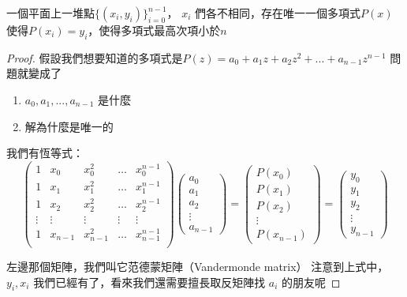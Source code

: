 \begin{lemma}
一個平面上一堆點$\{(x_i,y_i)\}^{n-1}_{i=0}$， $x_i$ 們各不相同，存在唯一一個多項式$P(x)$使得$P(x_i)=y_i$，使得多項式最高次項小於$n$
\end{lemma}
\begin{proof}
假設我們想要知道的多項式是$P(z)=a_0+a_1z+a_2z^2+...+a_{n-1}z^{n-1}$
問題就變成了
\begin{enumerate}
\item $a_0,a_1,...,a_{n-1}$ 是什麼
\item 解為什麼是唯一的
\end{enumerate}


我們有恆等式：
\[
\left(		
\begin{array}{ccccc}		
   1 & x_0 & x_0^2 & \dots & x_0^{n-1}  \\		
   1 & x_1 &  x_1^2 & \dots & x_1^{n-1}  \\	
   1 & x_2 &  x_2^2 & \dots & x_2^{n-1}  \\	
   \vdots & \vdots & \vdots & \vdots & \vdots \\	
   1 & x_{n-1} & x_{n-1}^2 & \dots & x_{n-1}^{n-1} \\		
    \end{array}		
\right)		
\left(		
\begin{array}{c}		
  a_0 \\		
  a_1 \\
  a_2 \\
  \vdots \\
  a_{n-1}		
 \end{array}		
\right)		
 =		
\left(		
\begin{array}{c}		
  P(x_0)\\		
 P(x_1) \\
  P(x_2) \\
  \vdots \\
  P(x_{n-1})		
 \end{array}		
\right)	
 =		
\left(		
\begin{array}{c}		
  y_0 \\		
  y_1 \\
  y_2 \\
  \vdots \\
  y_{n-1}		
 \end{array}		
\right)
 \]
 

左邊那個矩陣，我們叫它范德蒙矩陣（Vandermonde matrix）
注意到上式中， $y_i,x_i$ 我們已經有了，看來我們還需要擅長取反矩陣找 $a_i$ 的朋友呢


\end{proof}
